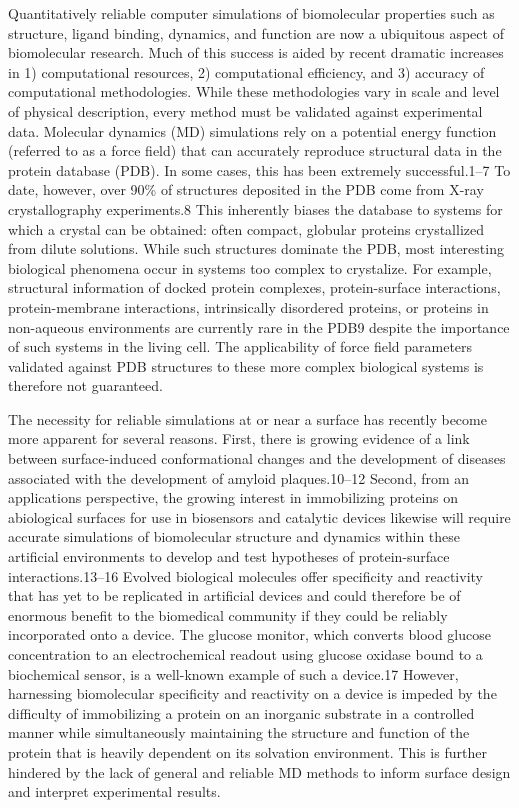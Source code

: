 Quantitatively reliable computer simulations of biomolecular properties such as structure, ligand binding, dynamics, and function are now a ubiquitous aspect of biomolecular research. 
Much of this success is aided by recent dramatic increases in 1) computational resources, 2) computational efficiency, and 3) accuracy of computational methodologies. 
While these methodologies vary in scale and level of physical description, every method must be validated against experimental data. 
Molecular dynamics (MD) simulations rely on a potential energy function (referred to as a force field) that can accurately reproduce structural data in the protein database (PDB). 
In some cases, this has been extremely successful.1–7 
To date, however, over 90\% of structures deposited in the PDB come from X-ray crystallography experiments.8 
This inherently biases the database to systems for which a crystal can be obtained: often compact, globular proteins crystallized from dilute solutions. 
While such structures dominate the PDB, most interesting biological phenomena occur in systems too complex to crystalize. 
For example, structural information of docked protein complexes, protein-surface interactions, protein-membrane interactions, intrinsically disordered proteins, or proteins in non-aqueous environments are currently rare in the PDB9 despite the importance of such systems in the living cell. 
The applicability of force field parameters validated against PDB structures to these more complex biological systems is therefore not guaranteed.

The necessity for reliable simulations at or near a surface has recently become more apparent for several reasons. 
First, there is growing evidence of a link between surface-induced conformational changes and the development of diseases associated with the development of amyloid plaques.10–12 
Second, from an applications perspective, the growing interest in immobilizing proteins on abiological surfaces for use in biosensors and catalytic devices likewise will require accurate simulations of biomolecular structure and dynamics within these artificial environments to develop and test hypotheses of protein-surface interactions.13–16
Evolved biological molecules offer specificity and reactivity that has yet to be replicated in artificial devices and could therefore be of enormous benefit to the biomedical community if they could be reliably incorporated onto a device. 
The glucose monitor, which converts blood glucose concentration to an electrochemical readout using glucose oxidase bound to a biochemical sensor, is a well-known example of such a device.17 
However, harnessing biomolecular specificity and reactivity on a device is impeded by the difficulty of immobilizing a protein on an inorganic substrate in a controlled manner while simultaneously maintaining the structure and function of the protein that is heavily dependent on its solvation environment. 
This is further hindered by the lack of general and reliable MD methods to inform surface design and interpret experimental results.

